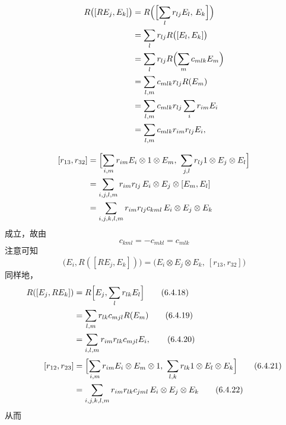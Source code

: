 \[
\begin{aligned}
R\bigl([RE_j,E_k]\bigr)
  &= R\Bigl(\Bigl[\sum_l r_{lj}E_l,\, E_k\Bigr]\Bigr) \\
  &= \sum_l r_{lj}R\bigl([E_l,E_k]\bigr) \\
  &= \sum_l r_{lj}R\Bigl(\sum_m c_{mlk}E_m\Bigr) \\
  &= \sum_{l,m} c_{mlk}r_{lj}R(E_m) \\
  &= \sum_{l,m} c_{mlk}r_{lj}\sum_i r_{im}E_i \\
  &= \sum_{l,m} c_{mlk}r_{im}r_{lj}E_i,
\end{aligned}
\]

\[
\begin{aligned}
[r_{13},r_{32}]
  &= \Bigl[\sum_{i,m} r_{im}E_i\otimes 1\otimes E_m,\ \sum_{j,l} r_{lj}1\otimes E_j\otimes E_l\Bigr] \\
  &= \sum_{i,j,l,m} r_{im}r_{lj}\,E_i\otimes E_j\otimes [E_m,E_l] \\
  &= \sum_{i,j,k,l,m} r_{im}r_{lj}c_{kml}\,E_i\otimes E_j\otimes E_k
\end{aligned}
\]
成立，故由
\begin{equation}
  c_{kml} = -c_{mkl} = c_{mlk}
  \tag{6.4.16}
\end{equation}
注意可知
\begin{equation}
  \bigl(E_i, R([RE_j,E_k])\bigr) = \bigl(E_i\otimes E_j\otimes E_k,\ [r_{13},r_{32}]\bigr)
  \tag{6.4.17}
\end{equation}
同样地，
\begin{align}
  R([E_j,RE_k]) &= R\Bigl[E_j,\sum_l r_{lk}E_l\Bigr] \tag{6.4.18}\\
  &= \sum_{l,m} r_{lk}c_{mjl}R(E_m) \tag{6.4.19}\\
  &= \sum_{i,l,m} r_{im}r_{lk}c_{mjl}E_i, \tag{6.4.20}\\[2pt]
  [r_{12},r_{23}]
  &= \Bigl[\sum_{i,m} r_{im}E_i\otimes E_m\otimes 1,\ \sum_{l,k} r_{lk}1\otimes E_l\otimes E_k\Bigr] \tag{6.4.21}\\
  &= \sum_{i,j,k,l,m} r_{im}r_{lk}c_{jml}\,E_i\otimes E_j\otimes E_k \tag{6.4.22}
\end{align}
从而

